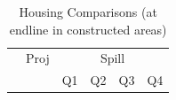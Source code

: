\documentclass[12pt]{article}
\begin{document}
\begin{table}[h!]
	\centering
	\caption{Housing Comparisons (at endline in constructed areas)}
\vspace{-2mm}
\begin{tabular}{l*{1}{ccccc}}
\toprule
& Proj & \multicolumn{4}{c}{ Spill} \\
&  & Q1 & Q2 & Q3 &Q4 \\
\midrule
 
\bottomrule
\end{tabular}
\end{table}



%  
\end{document}
